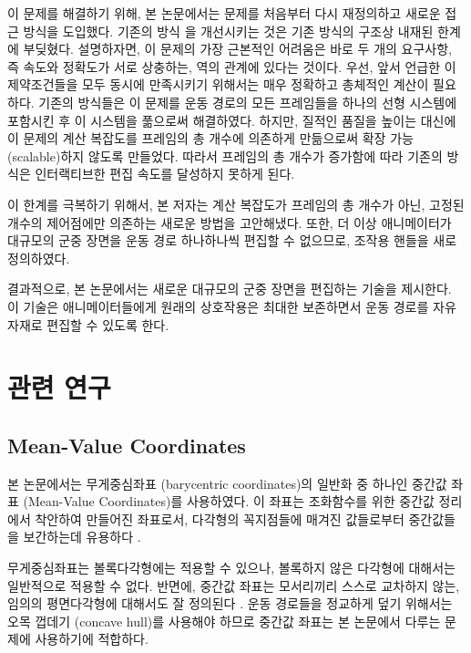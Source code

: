 \documentclass[12pt,a4paper,oneside,final]{report}
\newcommand{\Floater}{\cite{Floater200319}}
\newcommand{\Hormann}{\cite{Hormann:2006:MVC:1183287.1183295}}
\begin{document}
이 문제를 해결하기 위해, 본 논문에서는 문제를 처음부터 다시 재정의하고 새로운
접근 방식을 도입했다. 기존의 방식 \cite{Kim:2009:SMM:1531326.1531385}을
개선시키는 것은 기존 방식의 구조상 내재된 한계에 부딪혔다.  설명하자면, 이
문제의 가장 근본적인 어려움은 바로 두 개의 요구사항, 즉 속도와 정확도가 서로
상충하는, 역의 관계에 있다는 것이다. 우선, 앞서 언급한 이 제약조건들을 모두
동시에 만족시키기 위해서는 매우 정확하고 총체적인 계산이 필요하다.  기존의
방식들은 이 문제를 운동 경로의 모든 프레임들을 하나의 선형 시스템에 포함시킨 후
이 시스템을 풂으로써 해결하였다. 하지만, 질적인 품질을 높이는 대신에 이 문제의
계산 복잡도를 프레임의 총 개수에 의존하게 만듦으로써 확장 가능 (scalable)하지
않도록 만들었다. 따라서 프레임의 총 개수가 증가함에 따라 기존의 방식은
인터랙티브한 편집 속도를 달성하지 못하게 된다.

이 한계를 극복하기 위해서, 본 저자는 계산 복잡도가 프레임의 총 개수가 아닌,
고정된 개수의 제어점에만 의존하는 새로운 방법을 고안해냈다. 또한, 더 이상
애니메이터가 대규모의 군중 장면을 운동 경로 하나하나씩 편집할 수 없으므로,
조작용 핸들을 새로 정의하였다.


결과적으로, 본 논문에서는 새로운 대규모의 군중 장면을 편집하는 기술을 제시한다.
이 기술은 애니메이터들에게 원래의 상호작용은 최대한 보존하면서 운동 경로를
자유자재로 편집할 수 있도록 한다.


\chapter{관련 연구} \section{Mean-Value Coordinates} 본 논문에서는 무게중심좌표
(barycentric coordinates)의 일반화 중 하나인 중간값 좌표 (Mean-Value
Coordinates)를 사용하였다. 이 좌표는 조화함수를 위한 중간값 정리에서 착안하여
만들어진 좌표로서, 다각형의 꼭지점들에 매겨진 값들로부터 중간값들을 보간하는데
유용하다 \Floater.

무게중심좌표는 볼록다각형에는 적용할 수 있으나, 볼록하지 않은 다각형에 대해서는
일반적으로 적용할 수 없다.  반면에, 중간값 좌표는 모서리끼리 스스로 교차하지
않는, 임의의 평면다각형에 대해서도 잘 정의된다 \Hormann. 운동 경로들을 정교하게
덮기 위해서는 오목 껍데기 (concave hull)를 사용해야 하므로 중간값 좌표는 본
논문에서 다루는 문제에 사용하기에 적합하다.

%
\end{document}
